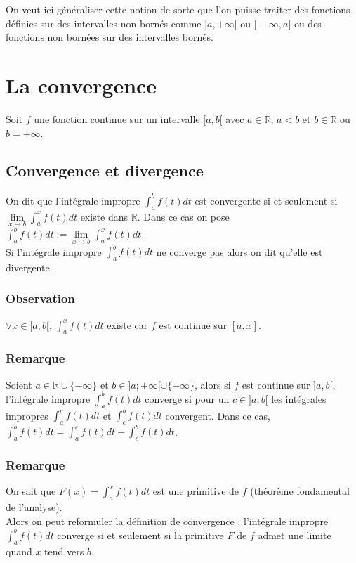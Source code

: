 \documentclass[a4paper,10pt]{book} %
\newcommand{\R}{\mathbb{R}}
\newcommand{\displayAmath}{\displaystyle}
\begin{document}
On veut ici généraliser cette notion de sorte que l'on puisse traiter des fonctions définies sur des intervalles non bornés comme $[a,+\infty[$ ou $ ]-\infty,a]$ ou des fonctions non bornées sur des intervalles bornés.

\section{La convergence}
Soit $f$ une fonction continue sur un intervalle $[a,b[$ avec $a\in\R$, $a<b$ et $b\in\R$ ou $b=+\infty$.

\subsection{Convergence et divergence}
On dit que l'intégrale impropre $\displaystyle \int_{a}^{b}f(t)dt$ est convergente si et seulement si $\displaystyle\lim\limits_{x\rightarrow b}\int_a^xf(t)dt$ existe dans $\R$. Dans ce cas on pose $\displaystyle\int_a^bf(t)dt:=\lim\limits_{x\rightarrow b}\int_a^xf(t)dt$.\\

Si l'intégrale impropre $\displayAmath\int_a^bf(t)dt$ ne converge pas alors on dit qu'elle est divergente.

\subsubsection{Observation}
$\forall x\in [a,b[$, $\displayAmath\int_a^xf(t)dt$ existe car $f$ est continue sur $[a,x]$.

\subsubsection{Remarque}
Soient $a\in\R\cup\{-\infty\}$ et $b\in]a;+\infty[\cup\{+\infty\}$, alors si $f$ est continue sur $]a,b[$, l'intégrale impropre $\displayAmath\int_a^bf(t)dt$ converge si pour un $c\in ]a,b[$ les intégrales impropres $\displayAmath\int_a^cf(t)dt$ et $\displayAmath\int_c^bf(t)dt$ convergent.
Dans ce cas, $\displayAmath\int_a^bf(t)dt=\displayAmath\int_a^cf(t)dt+\displayAmath\int_c^bf(t)dt$.

\subsubsection{Remarque}
On sait que $F(x)=\int_{a}^{x}f(t)dt$ est une primitive de $f$ (théorème fondamental de l'analyse).\\
Alors on peut reformuler la définition de convergence :
l'intégrale impropre $\int_{a}^{b} f(t)dt$ converge si et seulement si la primitive $F$ de $f$ admet une limite quand $x$ tend vers $b$.
\end{document}

